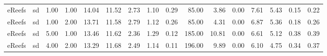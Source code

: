 \begin{table}[ht]
\begin{tabular}{llrrrrrrrrrrrrrr}
  eReefs & sd & 1.00 & 1.00 & 14.04 & 11.52 & 2.73 & 1.10 & 0.29 & 85.00 & 3.86 & 0.00 & 7.61 & 5.43 & 0.15 & 0.22 \\ 
  eReefs & sd & 1.00 & 2.00 & 13.71 & 11.58 & 2.79 & 1.12 & 0.26 & 85.00 & 4.31 & 0.00 & 6.87 & 5.36 & 0.18 & 0.26 \\ 
  eReefs & sd & 5.00 & 1.00 & 13.46 & 11.62 & 2.36 & 1.29 & 0.12 & 185.00 & 10.81 & 0.00 & 6.61 & 5.12 & 0.38 & 0.39 \\ 
  eReefs & sd & 4.00 & 2.00 & 13.29 & 11.68 & 2.49 & 1.14 & 0.11 & 196.00 & 9.89 & 0.00 & 6.10 & 4.75 & 0.34 & 0.37 \\ 
  \end{tabular}
\endgroup
\end{table}
